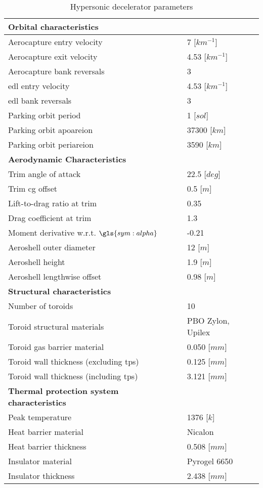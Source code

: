 \begin{table}[H]
	\centering
	\caption{Hypersonic decelerator parameters}
	\label{tab:DeceleratorPar}
	\begin{tabular}{|p{}|p{}|} \hline
		\textbf{Orbital characteristics}             	& 			\\ \hline \hline
		Aerocapture entry velocity       				&	 7 [$km^{-1}$] 		\\ \hline
		Aerocapture exit velocity				 		&    4.53 [$km^{-1}$]  	  	\\ \hline
		Aerocapture bank reversals				        &  	 3 		\\ \hline
		\gls{edl} entry velocity					 	&  	 4.53 [$km^{-1}$]	\\ \hline
		\gls{edl} bank reversals					 	&  	 3	\\ \hline
		Parking orbit period						 	&  	 1 [$sol$]		\\ \hline
		Parking orbit apoareion			 				&  	37300 [$km$]		\\ \hline
		Parking orbit periareion			 			&  	3590 [$km$]		\\ \hline
		\textbf{Aerodynamic Characteristics}			&			\\ \hline \hline
		Trim angle of attack				 			&  22.5 [$deg$]			\\ \hline
		Trim \gls{cg} offset							&  0.5 [$m$]		\\ \hline
		Lift-to-drag ratio at trim			 			&  	0.35	\\ \hline
		Drag coefficient at trim			 			&  	1.3	\\ \hline
		Moment derivative w.r.t. $\gls{sym:alpha}$		&  	-0.21		\\ \hline
		Aeroshell outer diameter						&  	12 [$m$]		\\ \hline
		Aeroshell height								&  	1.9 [$m$]		\\ \hline
		Aeroshell lengthwise offset						&  	0.98 [$m$]		\\ \hline
		\textbf{Structural characteristics}				&			\\ \hline \hline
		Number of toroids					 			&   10			\\ \hline 
		Toroid structural materials						 			&  	PBO Zylon, Upilex		\\ \hline
		Toroid gas barrier material		&	0.050 [$mm$]		\\ \hline
		Toroid wall thickness (excluding \gls{tps})		&	0.125 [$mm$]		\\ \hline
		Toroid wall thickness (including \gls{tps})		&	3.121 [$mm$]		\\ \hline
		\textbf{Thermal protection system characteristics}	&		\\ \hline \hline
		Peak temperature							&	 1376 [$k$]		\\ \hline
		Heat barrier material							&	Nicalon		\\ \hline
		Heat barrier thickness							&	0.508 [$mm$]		\\ \hline
		Insulator material								&	Pyrogel 6650		\\ \hline
		Insulator thickness								&	2.438 [$mm$]		\\ \hline
			

\end{tabular}
\end{table}
